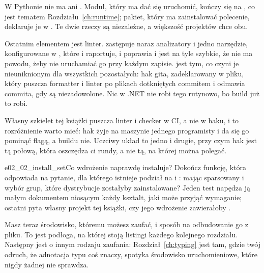 \begin{csbox}
W Pythonie nie ma  ani . Moduł, który ma dać się
uruchomić, kończy się na , co jest
tematem Rozdziału~\ref{ch:runtime}; pakiet, który ma zainstalować polecenie,
deklaruje je w . Te dwie rzeczy są niezależne, a
większość projektów chce obu.
\end{csbox}

\noindent
Ostatnim elementem jest linter.  zastępuje naraz analizatory i
 \dash{} jedno narzędzie, konfigurowane w
, które i raportuje, i poprawia \dash{} i jest na tyle
szybkie, że nie ma powodu, żeby nie uruchamiać go przy każdym zapisie.
 jest tym, co czyni je nieuniknionym dla wszystkich
pozostałych: hak gita, zadeklarowany w pliku, który puszcza formatter i linter
po plikach dotkniętych commitem i odmawia commita, gdy są niezadowolone. Nic w
.NET nie robi tego rutynowo, bo build już to robi.

Własny szkielet tej książki puszcza linter i checker w CI, a nie w haku, i to
rozróżnienie warto mieć: hak żyje na maszynie jednego programisty i da się go
pominąć flagą, a buildu nie. Uczciwy układ to jedno i drugie, przy czym hak
jest tą połową, która oszczędza ci rundy, a nie tą, na której można polegać.

\begin{exercise}{e02_02_install_set}{Co wdrożenie naprawdę instaluje?}
Dokończ funkcję, która odpowiada na pytanie, dla którego istnieje podział na
\code{[project]} i : mając sparsowany
 i wybór grup, które dystrybucje zostałyby
zainstalowane? Jeden test napędza ją małym dokumentem niosącym każdy kształt,
jaki może przyjąć wymaganie; ostatni pyta własny projekt tej książki, czy jego
wdrożenie zawierałoby .
\end{exercise}

\noindent
Masz teraz środowisko, któremu możesz zaufać, i sposób na odbudowanie go z
pliku. To jest podłoga, na której stoją listingi każdego kolejnego rozdziału.
Następny jest o innym rodzaju zaufania: Rozdział~\ref{ch:typing} jest tam,
gdzie twój odruch, że adnotacja typu coś znaczy, spotyka środowisko
uruchomieniowe, które nigdy żadnej nie sprawdza.
